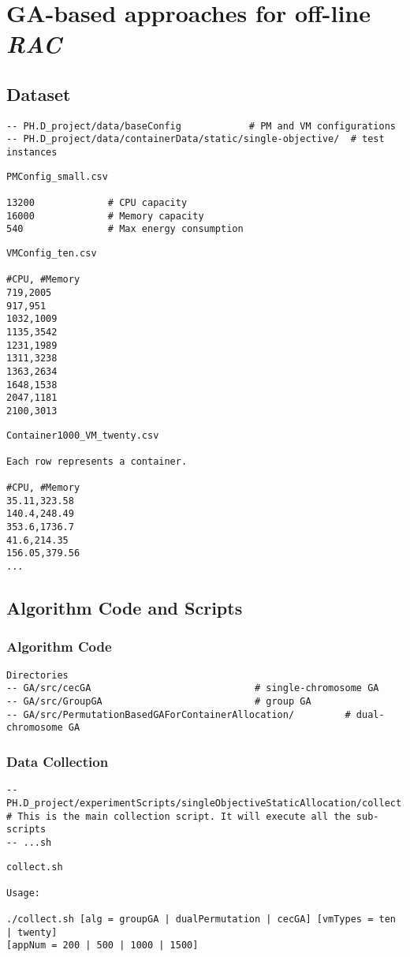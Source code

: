 \chapter{GA-based approaches for off-line \emph{RAC}}

\section{Dataset}
\begin{lstlisting}
-- PH.D_project/data/baseConfig            # PM and VM configurations
-- PH.D_project/data/containerData/static/single-objective/  # test instances
\end{lstlisting}

\begin{lstlisting}
PMConfig_small.csv

13200             # CPU capacity
16000             # Memory capacity
540               # Max energy consumption
\end{lstlisting}

\begin{lstlisting}
VMConfig_ten.csv

#CPU, #Memory
719,2005
917,951
1032,1009
1135,3542
1231,1989
1311,3238
1363,2634
1648,1538
2047,1181
2100,3013
\end{lstlisting}

\begin{lstlisting}
Container1000_VM_twenty.csv

Each row represents a container.

#CPU, #Memory
35.11,323.58
140.4,248.49
353.6,1736.7
41.6,214.35
156.05,379.56
...
\end{lstlisting}
\section{Algorithm Code and Scripts}
\subsection{Algorithm Code}

\begin{lstlisting}
Directories
-- GA/src/cecGA 							# single-chromosome GA
-- GA/src/GroupGA							# group GA
-- GA/src/PermutationBasedGAForContainerAllocation/			# dual-chromosome GA
\end{lstlisting}

\subsection{Data Collection}
\begin{lstlisting}
-- PH.D_project/experimentScripts/singleObjectiveStaticAllocation/collect.sh			
# This is the main collection script. It will execute all the sub-scripts
-- ...sh
\end{lstlisting}


\begin{lstlisting}
collect.sh

Usage:

./collect.sh [alg = groupGA | dualPermutation | cecGA] [vmTypes = ten | twenty] 
[appNum = 200 | 500 | 1000 | 1500]
\end{lstlisting}